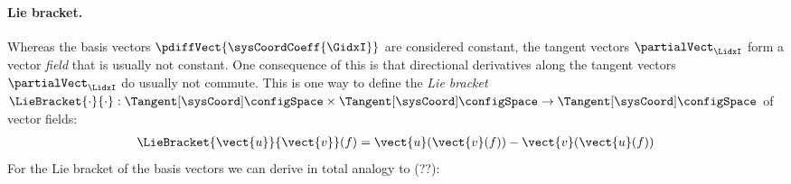 \paragraph{Lie bracket.}
Whereas the basis vectors $\pdiffVect{\sysCoordCoeff{\GidxI}}$ are considered constant, the tangent vectors $\partialVect_{\LidxI}$ form a vector \textit{field} that is usually not constant.
One consequence of this is that directional derivatives along the tangent vectors $\partialVect_{\LidxI}$ do usually not commute.
This is one way to define the \textit{Lie bracket} $\LieBracket{\cdot}{\cdot} : \Tangent[\sysCoord]\configSpace \times \Tangent[\sysCoord]\configSpace \rightarrow \Tangent[\sysCoord]\configSpace$ of vector fields:
\begin{align}
 \LieBracket{\vect{u}}{\vect{v}}(f) = \vect{u}(\vect{v}(f)) - \vect{v}(\vect{u}(f))
\end{align}
For the Lie bracket of the basis vectors we can derive in total analogy to (??): 

